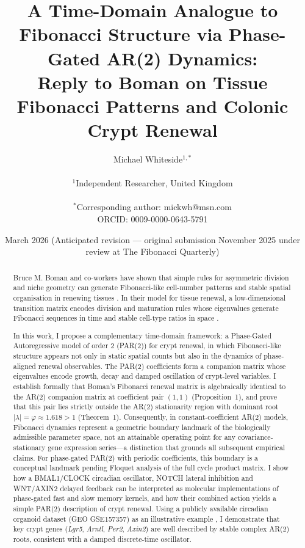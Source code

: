 \documentclass[11pt,letterpaper]{article}
\title{\textbf{A Time-Domain Analogue to Fibonacci Structure via Phase-Gated AR(2) Dynamics:\\
Reply to Boman on Tissue Fibonacci Patterns and Colonic Crypt Renewal}}
\author{
Michael Whiteside$^{1,*}$ \\
\\
$^1$Independent Researcher, United Kingdom \\
\\
$^*$Corresponding author: mickwh@msn.com \\
ORCID: 0009-0000-0643-5791
}
\date{March 2026 (Anticipated revision — original submission November 2025 under review at The Fibonacci Quarterly)}
\theoremstyle{definition}
\theoremstyle{remark}
\begin{document}
\maketitle

\begin{abstract}
\noindent Bruce M. Boman and co-workers have shown that simple rules for asymmetric division and niche geometry can generate Fibonacci-like cell-number patterns and stable spatial organisation in renewing tissues \citep{boman2017fibonacci}. In their model for tissue renewal, a low-dimensional transition matrix encodes division and maturation rules whose eigenvalues generate Fibonacci sequences in time and stable cell-type ratios in space \citep{boman2025dynamic}.

In this work, I propose a complementary time-domain framework: a Phase-Gated Autoregressive model of order 2 (PAR(2)) for crypt renewal, in which Fibonacci-like structure appears not only in static spatial counts but also in the dynamics of phase-aligned renewal observables. The PAR(2) coefficients form a companion matrix whose eigenvalues encode growth, decay and damped oscillation of crypt-level variables. I establish formally that Boman's Fibonacci renewal matrix is algebraically identical to the AR(2) companion matrix at coefficient pair $(1,1)$ (Proposition~1), and prove that this pair lies strictly outside the AR(2) stationarity region with dominant root $|\lambda|=\varphi\approx 1.618>1$ (Theorem~1). Consequently, in constant-coefficient AR(2) models, Fibonacci dynamics represent a geometric boundary landmark of the biologically admissible parameter space, not an attainable operating point for any covariance-stationary gene expression series---a distinction that grounds all subsequent empirical claims. For phase-gated PAR(2) with periodic coefficients, this boundary is a conceptual landmark pending Floquet analysis of the full cycle product matrix. I show how a BMAL1/CLOCK circadian oscillator, NOTCH lateral inhibition and WNT/AXIN2 delayed feedback can be interpreted as molecular implementations of phase-gated fast and slow memory kernels, and how their combined action yields a simple PAR(2) description of crypt renewal. Using a publicly available circadian organoid dataset (GEO GSE157357) as an illustrative example \citep{stokes2021bmal1}, I demonstrate that key crypt genes (\textit{Lgr5}, \textit{Arntl}, \textit{Per2}, \textit{Axin2}) are well described by stable complex AR(2) roots, consistent with a damped discrete-time oscillator.


\end{abstract}
\end{document}
